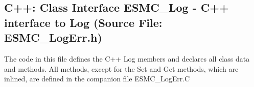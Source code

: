  
\setlength{\parskip}{0pt}
\setlength{\parindent}{0pt}
\setlength{\baselineskip}{11pt}
 
\def\bv{\begin{verbatim}}
\def\ev{\end{verbatim}}
\def\be{\begin{equation}}
\def\ee{\end{equation}}
\def\bea{\begin{eqnarray}}
\def\eea{\end{eqnarray}}
\def\bi{\begin{itemize}}
\def\ei{\end{itemize}}
\def\bn{\begin{enumerate}}
\def\en{\end{enumerate}}
\def\bd{\begin{description}}
\def\ed{\end{description}}
\def\({\left (}
\def\){\right )}
\def\[{\left [}
\def\]{\right ]}
\def\<{\left  \langle}
\def\>{\right \rangle}
\def\cI{{\cal I}}
\def\diag{\mathop{\rm diag}}
\def\tr{\mathop{\rm tr}}


 
\subsection{C++:  Class Interface ESMC\_Log - C++ interface to Log (Source File: ESMC\_LogErr.h)}


  
  
   The code in this file defines the C++ Log members and declares all class
   data and methods.  All methods, except for the Set and Get methods, which
   are inlined, are defined in the companion file ESMC\_LogErr.C
  

